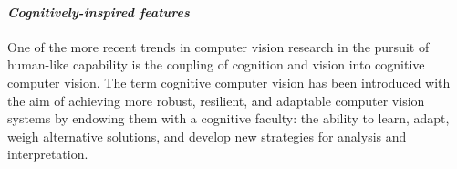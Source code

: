 


\paragraph{\textit{Cognitively-inspired features} \label{proposed-cognitive}}
One of the more recent trends in computer vision research in the pursuit of human-like capability is the coupling of cognition and vision into cognitive computer vision. The term cognitive computer vision has been introduced with the aim of achieving more robust, resilient, and adaptable computer vision systems by endowing them with a cognitive faculty: the ability to learn, adapt, weigh alternative solutions, and develop new strategies for analysis and interpretation.

